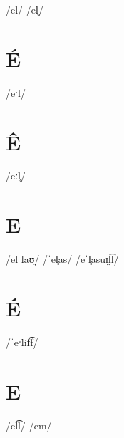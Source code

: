 \documentclass[10pt,a4paper,twoside]{book}
\begin{document}
\begin{multicols}{3}
 {/el/} {}
 {/el̥/} {}
\end{multicols}

\section*{É}

\begin{multicols}{3}
 {/eˑl/} {}
\end{multicols}

\section*{Ê}

\begin{multicols}{3}
 {/eːl̥/} {}
\end{multicols}

\section*{E}

\begin{multicols}{3}
 {/el laʊ̯/} {}
 {/ˈel̥as/} {}
 {/eˈl̥asuɪ̯l͡l/} {}
\end{multicols}

\section*{É}

\begin{multicols}{3}
 {/ˈeˑlif͡f/} {}
\end{multicols}

\section*{E}

\begin{multicols}{3}
 {/el͡l/} {}
 {/em/} {}
\end{multicols}
\end{document}
